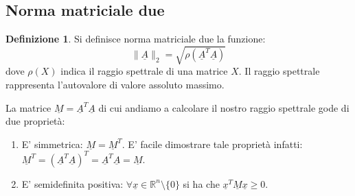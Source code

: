\documentclass[12pt, a4paper]{book}
\theoremstyle{definition}
\newtheorem{defn}{Definizione}[section]
\newcommand{\VarMtrx}[1]{\ensuremath{\underline{#1}}}
\begin{document}
\subsection{Norma matriciale due}
\begin{flushleft}
\begin{defn}
Si definisce norma matriciale due la funzione:
\[ \lVert\VarMtrx{A}\rVert_{2} = \sqrt{\rho(\VarMtrx{A}^{T}\VarMtrx{A})} \]
dove $\rho(X)$ indica il raggio spettrale di una matrice $X$. Il raggio spettrale rappresenta l'autovalore di valore assoluto massimo. 
\end{defn}

La matrice $\VarMtrx{M}=\VarMtrx{A}^{T}\VarMtrx{A}$ di cui andiamo a calcolare il nostro raggio spettrale gode di due proprietà: 
\begin{enumerate}
	\item E' simmetrica: $\VarMtrx{M} = \VarMtrx{M}^{T}$.  E' facile dimostrare tale proprietà infatti: $\VarMtrx{M}^{T} = (\VarMtrx{A}^{T}\VarMtrx{A})^{T} = \VarMtrx{A}^{T}\VarMtrx{A} = \VarMtrx{M} $. 
	\item E' semidefinita positiva: $\forall \VarMtrx{x} \in \mathbb{R}^{n} \setminus \{0\}$ si ha che $\VarMtrx{x}^{T}\VarMtrx{M}\VarMtrx{x} \geq 0$.
\end{enumerate}
\end{flushleft}
\end{document}
